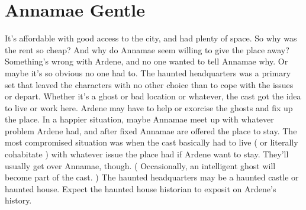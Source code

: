 \documentclass[12pt]{book}
\begin{document}
\chapter{Annamae Gentle}

It's affordable with good access to the city, and had plenty of space. So why was the rent so cheap? And why do Annamae seem willing to give the place away? Something's wrong with Ardene, and no one wanted to tell Annamae why. Or maybe it's so obvious no one had to. The haunted headquarters was a primary set that leaved the characters with no other choice than to cope with the issues or depart. Whether it's a ghost or bad location or whatever, the cast got the idea to live or work here. Ardene may have to help or exorcise the ghosts and fix up the place. In a happier situation, maybe Annamae meet up with whatever problem Ardene had, and after fixed Annamae are offered the place to stay. The most compromised situation was when the cast basically had to live ( or literally cohabitate ) with whatever issue the place had if Ardene want to stay. They'll usually get over Annamae, though. ( Occasionally, an intelligent ghost will become part of the cast. ) The haunted headquarters may be a haunted castle or haunted house. Expect the haunted house historian to exposit on Ardene's history.
\end{document}
